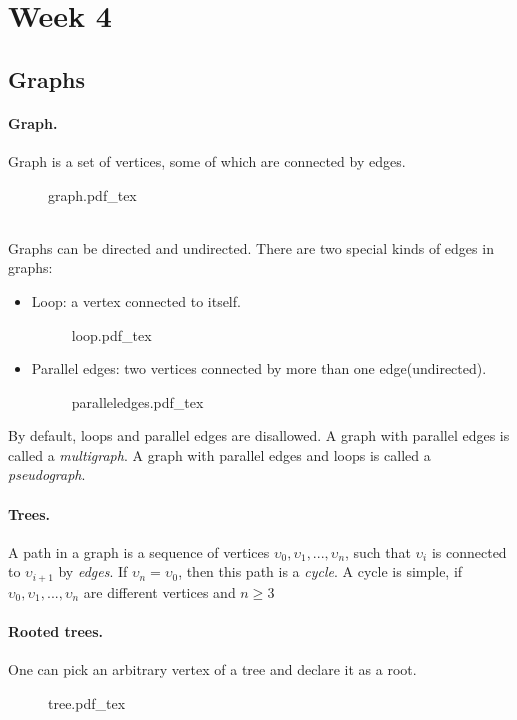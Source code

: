 \documentclass{article}
\newcommand{\incfig}[2][1]{%
    \def\svgwidth{#1\columnwidth}
    {#2.pdf_tex}
}
\begin{document}
\newpage

\section{Week 4}

\subsection{Graphs}

\paragraph{Graph.}
Graph is a set of vertices, some of which are connected by edges.
\begin{figure}[h!]
  \centering
  \incfig{graph}
\end{figure}
\\
Graphs can be directed and undirected. There are two special kinds of edges in graphs:
\begin{itemize}
\item Loop: a vertex connected to itself.
\begin{figure}[h!]
  \centering
  \incfig{loop}
\end{figure}
\newpage
\item Parallel edges: two vertices connected by more than one edge(undirected).
\begin{figure}[h!]
  \centering
  \incfig{paralleledges}
\end{figure}
\end{itemize}
By default, loops and parallel edges are disallowed. A graph with parallel edges is called a {\it multigraph}. A graph with parallel edges and loops is called a {\it pseudograph}.

\paragraph{Trees.}
A path in a graph is a sequence of vertices $\upsilon_0, \upsilon_1, ..., \upsilon_n$, such that $\upsilon_i$ is connected to $\upsilon_{i+1}$ by {\it edges}. If $\upsilon_n = \upsilon_0$, then this path is a {\it cycle}. A cycle is simple, if $ \upsilon_0, \upsilon_1, ..., \upsilon_n$ are different vertices and $n \geq 3$

\paragraph{Rooted trees.}
One can pick an arbitrary vertex of a tree and declare it as a root.
\begin{figure}[h!]
  \centering
  \incfig{tree}
\end{figure}
\end{document}
